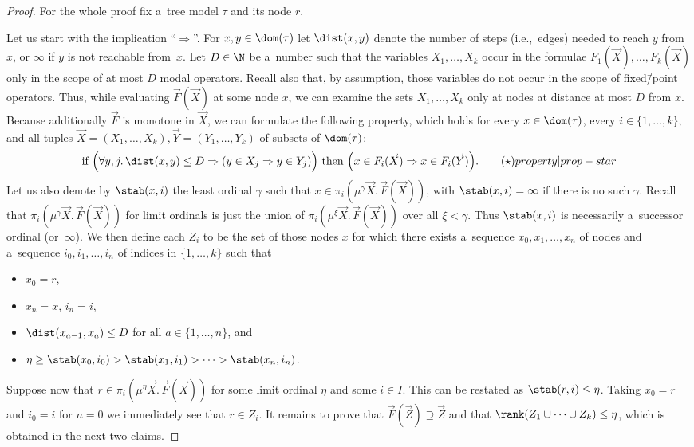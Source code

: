 \begin{proof}
	For the whole proof fix a~tree model $\tau$ and its node $r$.

	Let us start with the implication ``$\Rightarrow$''.
	For $x,y\in\dom(\tau)$ let $\dist(x,y)$ denote the number of steps (i.e.,~edges) needed to reach $y$ from $x$, or $\infty$ if $y$ is not reachable from~$x$.
	Let $D\in\N$ be a~number such that the variables $X_1,\dots,X_k$ occur in the formulae $F_1(\vec{X}),\dots,F_k(\vec{X})$ only in the scope of at most $D$ modal operators.
	Recall also that, by assumption, those variables do not occur in the scope of fixed\=/point operators.
	Thus, while evaluating $\vec{F}(\vec{X})$ at some node $x$, we can examine the sets $X_1,\dots,X_k$ only at nodes at distance at most $D$ from $x$.
	Because additionally $\vec{F}$ is monotone in $\vec{X}$, we can formulate the following property,
	which holds for every $x\in\dom(\tau)$, every $i\in\{1,\dots,k\}$, and all tuples $\vec{X}=(X_1,\dots,X_k),\vec{Y}=(Y_1,\dots,Y_k)$ of subsets of $\dom(\tau)$:
	\begin{align}
		\mbox{if }\Big(\forall y,j.\,\dist(x,y)\leq D\Rightarrow(y\in X_j\Rightarrow y\in Y_j)\Big)
		\mbox{ then }\Big(x\in F_i(\vec{X})\Rightarrow x\in F_i(\vec{Y})\Big).\tag{$\star$}\label[property]{prop-star}
	\end{align}
	Let us also denote by $\stab(x,i)$ the least ordinal $\gamma$ such that $x\in\pi_i(\mu^\gamma\vec{X}.\,\vec{F}(\vec{X}))$, with $\stab(x,i)=\infty$ if there is no such $\gamma$.
	Recall that $\pi_i(\mu^\gamma\vec{X}.\,\vec{F}(\vec{X}))$ for limit ordinals is just the union of $\pi_i(\mu^{\xi}\vec{X}.\,\vec{F}(\vec{X}))$ over all $\xi<\gamma$.
	Thus $\stab(x,i)$ is necessarily a~successor ordinal (or~$\infty$).
	We then define each $Z_i$ to be the set of those nodes $x$ for which there exists a~sequence $x_0,x_1,\dots,x_n$ of nodes and a~sequence $i_0,i_1,\dots,i_n$ of indices in $\{1,\dots,k\}$ such that
	\begin{itemize}
	\item	$x_0=r$,
	\item	$x_n=x$, $i_n=i$,
	\item	$\dist(x_{a-1},x_a)\leq D$ for all $a\in\{1,\dots,n\}$, and
	\item	$\eta\geq\stab(x_0,i_0)>\stab(x_1,i_1)>\dots>\stab(x_n,i_n)$.
	\end{itemize}
	Suppose now that $r\in\pi_i(\mu^\eta\vec{X}.\,\vec{F}(\vec{X}))$ for some limit ordinal $\eta$ and some $i\in I$.
	This can be restated as $\stab(r,i)\leq\eta$.
	Taking $x_0=r$ and $i_0=i$ for $n=0$ we immediately see that $r\in Z_i$.
	It remains to prove that $\vec{F}(\vec{Z})\supseteq\vec{Z}$ and that $\rank(Z_1\cup\dots\cup Z_k)\leq\eta$, which is obtained in the next two claims.


\end{proof}
